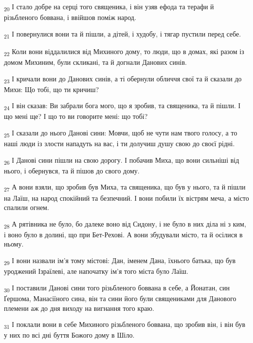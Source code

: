 \begin{tcolorbox}
\textsubscript{20} І стало добре на серці того священика, і він узяв ефода та терафи й різьбленого боввана, і ввійшов поміж народ.
\end{tcolorbox}
\begin{tcolorbox}
\textsubscript{21} І повернулися вони та й пішли, а дітей, і худобу, і тягар пустили перед себе.
\end{tcolorbox}
\begin{tcolorbox}
\textsubscript{22} Коли вони віддалилися від Михиного дому, то люди, що в домах, які разом із домом Михиним, були скликані, та й догнали Данових синів.
\end{tcolorbox}
\begin{tcolorbox}
\textsubscript{23} І кричали вони до Данових синів, а ті обернули обличчя свої та й сказали до Михи: Що тобі, що ти кричиш?
\end{tcolorbox}
\begin{tcolorbox}
\textsubscript{24} І він сказав: Ви забрали бога мого, що я зробив, та священика, та й пішли. І що мені ще? І що то ви говорите мені: що тобі?
\end{tcolorbox}
\begin{tcolorbox}
\textsubscript{25} І сказали до нього Данові сини: Мовчи, щоб не чути нам твого голосу, а то наші люди із злости нападуть на вас, і ти долучиш душу свою до своєї рідні.
\end{tcolorbox}
\begin{tcolorbox}
\textsubscript{26} І Данові сини пішли на свою дорогу. І побачив Миха, що вони сильніші від нього, і обернувся, та й пішов до свого дому.
\end{tcolorbox}
\begin{tcolorbox}
\textsubscript{27} А вони взяли, що зробив був Миха, та священика, що був у нього, та й пішли на Лаїш, на народ спокійний та безпечний. І вони побили їх вістрям меча, а місто спалили огнем.
\end{tcolorbox}
\begin{tcolorbox}
\textsubscript{28} А рятівника не було, бо далеке воно від Сидону, і не було в них діла ні з ким, і воно було в долині, що при Бет-Рехові. А вони збудували місто, та й осілися в ньому.
\end{tcolorbox}
\begin{tcolorbox}
\textsubscript{29} І вони назвали ім'я тому містові: Дан, іменем Дана, їхнього батька, що був уроджений Ізраїлеві, але напочатку ім'я того міста було Лаїш.
\end{tcolorbox}
\begin{tcolorbox}
\textsubscript{30} І поставили Данові сини того різьбленого боввана в себе, а Йонатан, син Ґершома, Манасіїного сина, він та сини його були священиками для Данового племени аж до дня виходу на вигнання того краю.
\end{tcolorbox}
\begin{tcolorbox}
\textsubscript{31} І поклали вони в себе Михиного різьбленого боввана, що зробив він, і він був у них по всі дні буття Божого дому в Шіло.
\end{tcolorbox}
